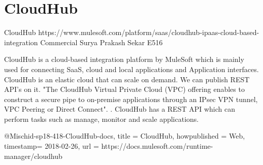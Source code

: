 \section{CloudHub}


CloudHub
https://www.mulesoft.com/platform/saas/cloudhub-ipaas-cloud-based-integration
Commercial
Surya Prakash Sekar
E516

CloudHub is a cloud-based integration platform by MuleSoft which is mainly 
used for connecting SaaS, cloud and local applications and Application 
interfaces. CloudHub is an elastic cloud that can scale on demand. We can 
publish REST API's on it. "The CloudHub Virtual Private Cloud (VPC) offering 
enables to construct a secure pipe to on-premise applications through an 
IPsec VPN tunnel, VPC Peering or Direct Connect". 
\cite{hid-sp18-418-CloudHub-docs}. CloudHub has a REST API which can perform 
tasks such as manage, monitor and scale applications.

@Misc{hid-sp18-418-CloudHub-docs,
title = {CloudHub},
howpublished = {Web},
timestamp= {2018-02-26},
url = {https://docs.mulesoft.com/runtime-manager/cloudhub}
}
